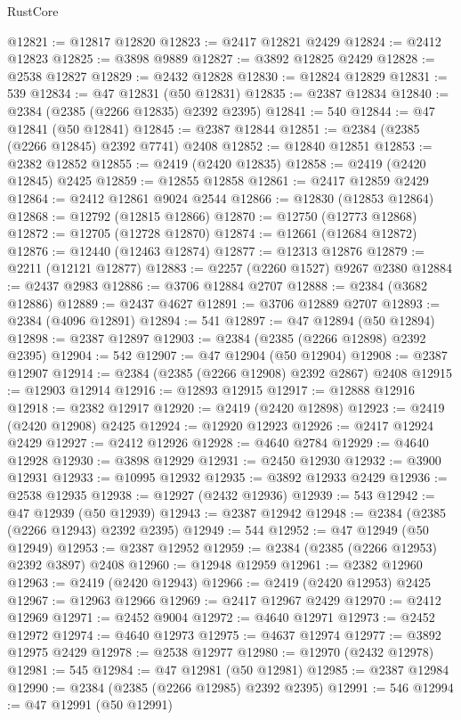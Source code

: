 \begin{lexlean}{RustCore}
\begin{coremodule}
@12821 := @12817 @12820
@12823 := @2417 @12821 @2429
@12824 := @2412 @12823
@12825 := @3898 @9889
@12827 := @3892 @12825 @2429
@12828 := @2538 @12827
@12829 := @2432 @12828
@12830 := @12824 @12829
@12831 := 539
@12834 := @47 @12831 (@50 @12831)
@12835 := @2387 @12834
@12840 := @2384 (@2385 (@2266 @12835) @2392 @2395)
@12841 := 540
@12844 := @47 @12841 (@50 @12841)
@12845 := @2387 @12844
@12851 := @2384 (@2385 (@2266 @12845) @2392 @7741) @2408
@12852 := @12840 @12851
@12853 := @2382 @12852
@12855 := @2419 (@2420 @12835)
@12858 := @2419 (@2420 @12845) @2425
@12859 := @12855 @12858
@12861 := @2417 @12859 @2429
@12864 := @2412 @12861 @9024 @2544
@12866 := @12830 (@12853 @12864)
@12868 := @12792 (@12815 @12866)
@12870 := @12750 (@12773 @12868)
@12872 := @12705 (@12728 @12870)
@12874 := @12661 (@12684 @12872)
@12876 := @12440 (@12463 @12874)
@12877 := @12313 @12876
@12879 := @2211 (@12121 @12877)
@12883 := @2257 (@2260 @1527) @9267 @2380
@12884 := @2437 @2983
@12886 := @3706 @12884 @2707
@12888 := @2384 (@3682 @12886)
@12889 := @2437 @4627
@12891 := @3706 @12889 @2707
@12893 := @2384 (@4096 @12891)
@12894 := 541
@12897 := @47 @12894 (@50 @12894)
@12898 := @2387 @12897
@12903 := @2384 (@2385 (@2266 @12898) @2392 @2395)
@12904 := 542
@12907 := @47 @12904 (@50 @12904)
@12908 := @2387 @12907
@12914 := @2384 (@2385 (@2266 @12908) @2392 @2867) @2408
@12915 := @12903 @12914
@12916 := @12893 @12915
@12917 := @12888 @12916
@12918 := @2382 @12917
@12920 := @2419 (@2420 @12898)
@12923 := @2419 (@2420 @12908) @2425
@12924 := @12920 @12923
@12926 := @2417 @12924 @2429
@12927 := @2412 @12926
@12928 := @4640 @2784
@12929 := @4640 @12928
@12930 := @3898 @12929
@12931 := @2450 @12930
@12932 := @3900 @12931
@12933 := @10995 @12932
@12935 := @3892 @12933 @2429
@12936 := @2538 @12935
@12938 := @12927 (@2432 @12936)
@12939 := 543
@12942 := @47 @12939 (@50 @12939)
@12943 := @2387 @12942
@12948 := @2384 (@2385 (@2266 @12943) @2392 @2395)
@12949 := 544
@12952 := @47 @12949 (@50 @12949)
@12953 := @2387 @12952
@12959 := @2384 (@2385 (@2266 @12953) @2392 @3897) @2408
@12960 := @12948 @12959
@12961 := @2382 @12960
@12963 := @2419 (@2420 @12943)
@12966 := @2419 (@2420 @12953) @2425
@12967 := @12963 @12966
@12969 := @2417 @12967 @2429
@12970 := @2412 @12969
@12971 := @2452 @9004
@12972 := @4640 @12971
@12973 := @2452 @12972
@12974 := @4640 @12973
@12975 := @4637 @12974
@12977 := @3892 @12975 @2429
@12978 := @2538 @12977
@12980 := @12970 (@2432 @12978)
@12981 := 545
@12984 := @47 @12981 (@50 @12981)
@12985 := @2387 @12984
@12990 := @2384 (@2385 (@2266 @12985) @2392 @2395)
@12991 := 546
@12994 := @47 @12991 (@50 @12991)

\end{coremodule}
\end{lexlean}
